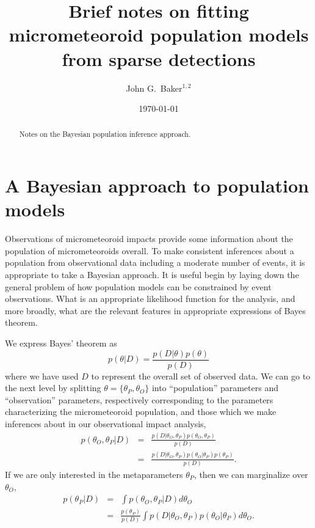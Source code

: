 \documentclass[twocolumn,showpacs,aps,prd,nobibnotes,nofootinbib,floatfix]{revtex4-1}
\begin{document}
\date{\today}
\title{Brief notes on fitting micrometeoroid population models from sparse detections}
\author{John G.~Baker$^{1,2}$}

\begin{abstract}
  Notes on the Bayesian population inference approach.
\end{abstract}

\maketitle
\section{A Bayesian approach to population models}
Observations of micrometeoroid impacts provide some information about the population of micrometeoroids overall.  To make consistent inferences about a population from observational data including a moderate number of events, it is appropriate to take a Bayesian approach.  It is useful begin by laying down the general problem of how population models can be constrained by event observations. What is an appropriate likelihood function for the analysis, and more broadly, what are the relevant features in appropriate expressions of Bayes theorem.  

We express Bayes' theorem as
\begin{equation}
  p(\theta|D)=\frac{p(D|\theta)p(\theta)}{p(D)}
\end{equation}
where we have used $D$ to represent the overall set of observed data.  We can go to the next level by splitting $\theta=\{\theta_P,\theta_O\}$ into ``population'' parameters and ``observation'' parameters, respectively corresponding to the parameters characterizing the micrometeoroid population, and those which we make inferences about in our observational impact analysis,
\begin{eqnarray*}
  p(\theta_O,\theta_P|D)&=&\frac{p(D|\theta_O,\theta_P)p(\theta_O,\theta_P)}{p(D)}\\
  &=&\frac{p(D|\theta_O,\theta_P)p(\theta_O|\theta_P)p(\theta_P)}{p(D)}.
\end{eqnarray*}
If we are only interested in the metaparameters $\theta_P$, then we can marginalize over $\theta_O$,
\begin{eqnarray}
  p(\theta_P|D)&=&\int p(\theta_O,\theta_P|D)
  d{\theta_O}\nonumber\\
  &=&\frac{ p(\theta_P)}{p(D)}\int p(D|\theta_O,\theta_P)p(\theta_O|\theta_P)d\theta_O.\label{eq:HierBayesThm}
\end{eqnarray} 
\end{document}
